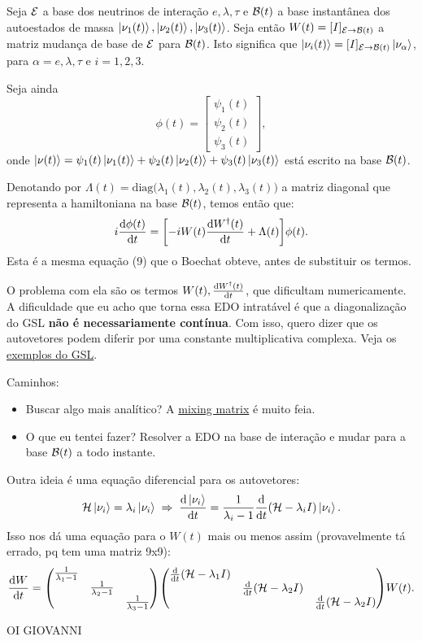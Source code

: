 \documentclass[a4paper,fleqn,12pt]{article}
\begin{document}
Seja $\mathcal{E}$ a base dos neutrinos de interação $e, \lambda, \tau$ e $\mathcal{B}(t)$ a base instantânea dos autoestados de massa $\ket{\nu_1(t)}, \ket{\nu_2(t)}, \ket{\nu_3(t)}$. Seja então $W(t) = [ I ]_{\mathcal{E} \to \mathcal{B}(t)}$ a matriz mudança de base de $\mathcal{E}$ para $\mathcal{B}(t)$. Isto significa que $\ket{\nu_i(t)} = [ I ]_{\mathcal{E} \to \mathcal{B}(t)} \ket{\nu_\alpha}$, para $\alpha = e, \lambda, \tau$ e $i = 1, 2, 3$.

Seja ainda
$$
\phi(t) =
\begin{bmatrix}
\psi_1(t) \\
\psi_2(t) \\
\psi_3(t)
\end{bmatrix},
$$
onde $\ket{\nu(t)} = \psi_1(t) \ket{\nu_1(t)} + \psi_2(t) \ket{\nu_2(t)} + \psi_3(t) \ket{\nu_3(t)}$ está escrito na base $\mathcal{B}(t)$.

Denotando por $\Lambda(t) = \text{diag}\Big(\lambda_1(t), \lambda_2(t), \lambda_3(t)\Big)$
a matriz diagonal que representa a hamiltoniana na base $\mathcal{B}(t)$, temos então que:
$$
i \dv{\phi(t)}{t} = \qty[ - i W(t) \dv{W^\dagger(t)}{t} + \Lambda(t) ] \phi(t).
$$
Esta é a mesma equação (9) que o Boechat obteve, antes de substituir os termos.

\n

O problema com ela são os termos $W(t), \dv{W^\dagger(t)}{t}$, que dificultam numericamente. A dificuldade que eu acho que torna essa EDO intratável é que a diagonalização do GSL \textbf{não é necessariamente contínua}. Com isso, quero dizer que os autovetores podem diferir por uma constante multiplicativa complexa. Veja os \href{https://www.gnu.org/software/gsl/doc/html/eigen.html#examples}{exemplos do GSL}.

\n

Caminhos:
\begin{itemize}
\item Buscar algo mais analítico? A \href{https://en.wikipedia.org/wiki/Pontecorvo\%E2\%80\%93Maki\%E2\%80\%93Nakagawa\%E2\%80\%93Sakata\_matrix}{mixing matrix} é muito feia.
\item O que eu tentei fazer? Resolver a EDO na base de interação e mudar para a base $\mathcal{B}(t)$ a todo instante.
\end{itemize}

\n

Outra ideia é uma equação diferencial para os autovetores:
$$
\mathcal{H} \ket{\nu_i} = \lambda_i \ket{\nu_i} \; \Rightarrow \;
\dv{\ket{\nu_i}}{t} = \frac{1}{\lambda_i - 1} \dv{t}\qty(\mathcal{H} - \lambda_i I) \ket{\nu_i}.
$$
Isso nos dá uma equação para o $W(t)$ mais ou menos assim (provavelmente tá errado, pq tem uma matriz 9x9):
$$
\dv{W}{t} =
\mqty(\dmat{\frac{1}{\lambda_1-1},\frac{1}{\lambda_2-1},\frac{1}{\lambda_3-1}})
\mqty(\dmat{\dv{t}(\H - \lambda_1 I), \dv{t}(\H - \lambda_2 I), \dv{t}(\H - \lambda_2 I)}) W(t).
$$

OI GIOVANNI
\end{document}
